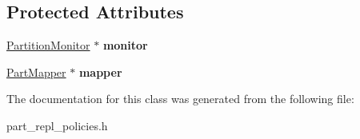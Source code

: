 \subsection*{Protected Attributes}
\begin{DoxyCompactItemize}
\item 
\hypertarget{classPartReplPolicy_aabaccc78bae4bf97a2b5f56fcf07521e}{\hyperlink{classPartitionMonitor}{Partition\-Monitor} $\ast$ {\bfseries monitor}}\label{classPartReplPolicy_aabaccc78bae4bf97a2b5f56fcf07521e}

\item 
\hypertarget{classPartReplPolicy_a191f3016eb499c36391c4b0d1bf10d37}{\hyperlink{classPartMapper}{Part\-Mapper} $\ast$ {\bfseries mapper}}\label{classPartReplPolicy_a191f3016eb499c36391c4b0d1bf10d37}

\end{DoxyCompactItemize}


The documentation for this class was generated from the following file\-:\begin{DoxyCompactItemize}
\item 
part\-\_\-repl\-\_\-policies.\-h\end{DoxyCompactItemize}
